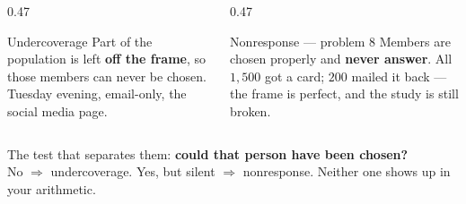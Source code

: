\documentclass[aspectratio=169, 11pt]{beamer}
\newcommand{\redink}[1]{{\color{redacc}\bfseries #1}}
\begin{document}
\begin{frame}[t, plain]
  \vspace{2pt}
  \begin{columns}[t]
    \begin{column}{0.47\textwidth}
      \begin{block}{Undercoverage}
        Part of the population is left \textbf{off the frame}, so those members can never be
        chosen. Tuesday evening, email-only, the social media page.
      \end{block}
    \end{column}
    \begin{column}{0.47\textwidth}
      \begin{block}{Nonresponse --- problem 8}
        Members are chosen properly and \textbf{never answer}. All $1{,}500$ got a card;
        $200$ mailed it back --- the frame is perfect, and the study is still broken.
      \end{block}
    \end{column}
  \end{columns}
  \vspace{12pt}
  \begin{center}
    {\large The test that separates them: \redink{could that person have been chosen?}}\\[6pt]
    {\small\color{slate} No $\Rightarrow$ undercoverage. \quad Yes, but silent $\Rightarrow$
    nonresponse. \quad Neither one shows up in your arithmetic.}
  \end{center}
\end{frame}
\end{document}
